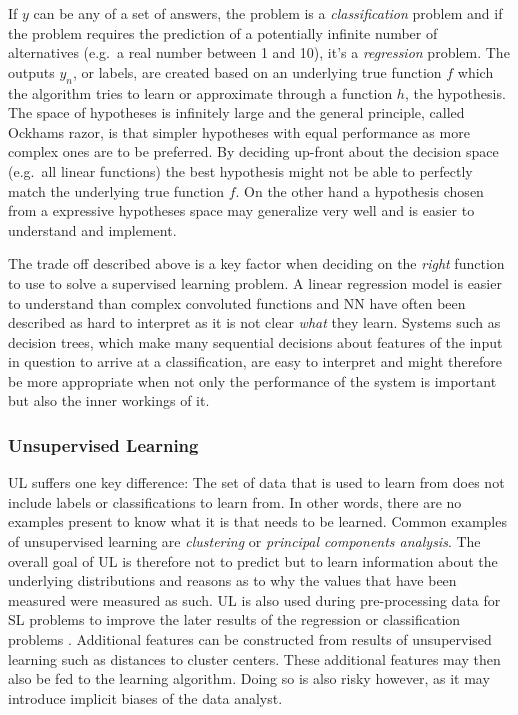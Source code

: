 If $y$ can be any of a set of answers, the problem is a \emph{classification}
problem and if the problem requires the prediction of a potentially infinite
number of alternatives (e.g.\ a real number between 1 and 10), it's a
\emph{regression} problem. The outputs $y_n$, or labels, are created based on an
underlying true function $f$ which the algorithm tries to learn or approximate
through a function $h$, the hypothesis. The space of hypotheses is infinitely
large and the general principle, called Ockhams razor, is that simpler hypotheses with equal
performance as more complex ones are to be preferred. By deciding up-front about
the decision space (e.g.\ all linear functions) the best hypothesis might not be able
to perfectly match the underlying true function $f$. On the other hand a
hypothesis chosen from a expressive hypotheses space may generalize very well
and is easier to understand and implement.

The trade off described above is a key factor when deciding on the \emph{right}
function to use to solve a supervised learning problem. A linear regression
model is easier to understand than complex convoluted functions and \ac{NN}
have often been described as hard to interpret as it is not clear \emph{what}
they learn. Systems such as decision trees, which make many sequential decisions
about features of the input in question to arrive at a classification, are easy
to interpret and might therefore be more appropriate when not only the
performance of the system is important but also the inner workings of it.


\subsubsection{Unsupervised Learning}
\acl {UL}  suffers one key difference: The set of data that is used to learn from does not include labels or
classifications to learn from. In other words, there are no examples present to know what it is that needs to be
learned. Common examples of unsupervised learning are \emph{clustering} or \emph{principal components analysis}. The
overall goal of \ac{UL} is therefore not to predict but to learn information about the underlying distributions and
reasons as to why the values that have been measured were measured as such. \ac{UL} is also used during pre-processing
data for \ac{SL} problems to improve the later results of the regression or classification problems
\cite[p.373f.]{james2013introduction}.
Additional features can be constructed from results of unsupervised learning such as distances to cluster centers. These
additional features may then also be fed to the learning algorithm. Doing so is also risky however, as it may introduce
implicit biases of the data analyst.

